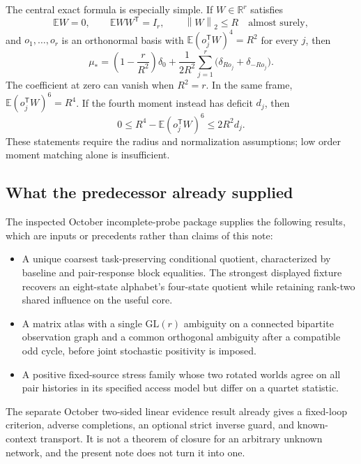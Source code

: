 \documentclass[11pt]{article}
\theoremstyle{definition}
\theoremstyle{remark}
\newcommand{\R}{\mathbb R}
\newcommand{\E}{\mathbb E}
\newcommand{\trans}{\mathsf T}
\newcommand{\norm}[1]{\left\lVert#1\right\rVert}
\begin{document}
The central exact formula is especially simple. If $W\in\R^r$ satisfies
\begin{equation}
\E W=0,\qquad \E WW^\trans=I_r,\qquad \norm{W}_2\le R
\quad\text{almost surely},
\label{eq:normalization-summary}
\end{equation}
and $o_1,\ldots,o_r$ is an orthonormal basis with
$\E(o_j^\trans W)^4=R^2$ for every $j$, then
\begin{equation}
\mu_*=\left(1-\frac r{R^2}\right)\delta_0+
\frac1{2R^2}\sum_{j=1}^r
\bigl(\delta_{Ro_j}+\delta_{-Ro_j}\bigr).
\label{eq:mu-star-summary}
\end{equation}
The coefficient at zero can vanish when $R^2=r$. In the same frame,
$\E(o_j^\trans W)^6=R^4$. If the fourth moment instead has deficit $d_j$,
then
\begin{equation}
0\le R^4-\E(o_j^\trans W)^6\le 2R^2d_j.
\label{eq:sixth-summary}
\end{equation}
These statements require the radius and normalization assumptions; low
order moment matching alone is insufficient.

\subsection{What the predecessor already supplied}

The inspected October incomplete-probe package supplies the following
results, which are inputs or precedents rather than claims of this note:
\begin{itemize}
\item A unique coarsest task-preserving conditional quotient, characterized
by baseline and pair-response block equalities. The strongest displayed
fixture recovers an eight-state alphabet's four-state quotient while
retaining rank-two shared influence on the useful core.
\item A matrix atlas with a single $\mathrm{GL}(r)$ ambiguity on a connected
bipartite observation graph and a common orthogonal ambiguity after a
compatible odd cycle, before joint stochastic positivity is imposed.
\item A positive fixed-source stress family whose two rotated worlds agree
on all pair histories in its specified access model but differ on a
quartet statistic.
\end{itemize}
The separate October two-sided linear evidence result already gives a
fixed-loop criterion, adverse completions, an optional strict inverse
guard, and known-context transport. It is not a theorem of closure for an
arbitrary unknown network, and the present note does not turn it into one.
\end{document}
